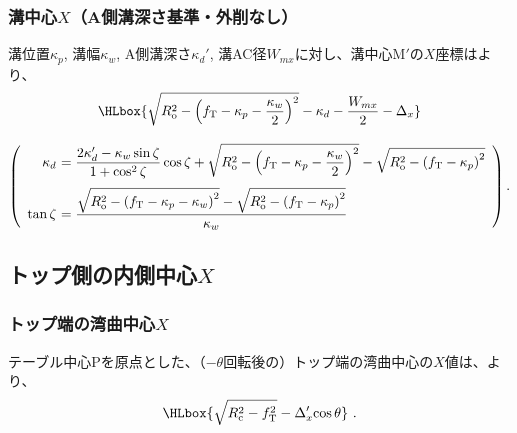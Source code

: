 \subsubsection{溝中心\texorpdfstring{$X$}{X}（A側溝深さ基準・外削なし）}
溝位置$\kappa_p$, 溝幅$\kappa_w$, A側溝深さ$\kappa_d'$, 溝AC径$W_{mx}$に対し、溝中心M$'$の$X$座標はより、
\begin{gather*}
  \HLbox{%
    \sqrt{R_\mathrm o^2-\left(f_\mathrm T-\kappa_p-\frac{\kappa_w}2\right)^2}
    -\kappa_d
    -\frac{W_{mx}}2
    -\Delta_x%
  }\\[9pt]
  \left(
  \begin{array}{rl}
  \kappa_d\!\!\!\!
  &= \displaystyle
     \frac{2\kappa_d'-\kappa_w\sin\zeta}{1+\cos^2\zeta}\cos\zeta
     +\sqrt{R_\mathrm o^2-\left(f_\mathrm T-\kappa_p-\frac{\kappa_w}2\right)^2}
     -\sqrt{R_\mathrm o^2-\left(f_\mathrm T-\kappa_p\right)^2}\\[12pt]
  \tan\zeta\!\!\!\!
  &= \displaystyle
     \frac{\sqrt{R_\mathrm o^2-\left(f_\mathrm T-\kappa_p-\kappa_w\right)^2}
           -\sqrt{R_\mathrm o^2-\left(f_\mathrm T-\kappa_p\right)^2}}
          {\kappa_w}
  \end{array}
  \right).
\end{gather*}


\clearpage
\subsection{トップ側の内側中心\texorpdfstring{$X$}{X}}

\subsubsection{トップ端の湾曲中心\texorpdfstring{$X$}{X}}
テーブル中心Pを原点とした、（$-\theta$回転後の）トップ端の湾曲中心の$X$値は、より、
\begin{align*}
  \HLbox{\sqrt{R_\mathrm c^2-f_\mathrm T^2}-\Delta_x'\!\cos\theta}~.
\end{align*}

